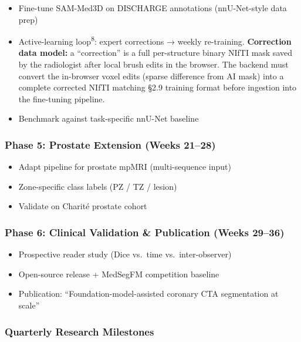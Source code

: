 \documentclass[
  11pt,
]{article}
\providecommand{\tightlist}{%
  \setlength{\itemsep}{0pt}\setlength{\parskip}{0pt}}
\begin{document}
\begin{itemize}
\tightlist
\item[$\square$]
  Fine-tune SAM-Med3D on DISCHARGE annotations (nnU-Net-style data prep)
\item[$\square$]
  Active-learning loop\textsuperscript{8}: expert corrections → weekly
  re-training. \textbf{Correction data model:} a ``correction'' is a
  full per-structure binary NIfTI mask saved by the radiologist after
  local brush edits in the browser. The backend must convert the
  in-browser voxel edits (sparse difference from AI mask) into a
  complete corrected NIfTI matching §2.9 training format before
  ingestion into the fine-tuning pipeline.
\item[$\square$]
  Benchmark against task-specific nnU-Net baseline
\end{itemize}

\subsubsection{Phase 5: Prostate Extension (Weeks
21--28)}\label{phase-5-prostate-extension-weeks-2128}

\begin{itemize}
\tightlist
\item[$\square$]
  Adapt pipeline for prostate mpMRI (multi-sequence input)
\item[$\square$]
  Zone-specific class labels (PZ / TZ / lesion)
\item[$\square$]
  Validate on Charité prostate cohort
\end{itemize}

\subsubsection{Phase 6: Clinical Validation \& Publication (Weeks
29--36)}\label{phase-6-clinical-validation-publication-weeks-2936}

\begin{itemize}
\tightlist
\item[$\square$]
  Prospective reader study (Dice vs.~time vs.~inter-observer)
\item[$\square$]
  Open-source release + MedSegFM competition baseline
\item[$\square$]
  Publication: ``Foundation-model-assisted coronary CTA segmentation at
  scale''
\end{itemize}

\subsubsection{Quarterly Research
Milestones}\label{quarterly-research-milestones}
\end{document}
